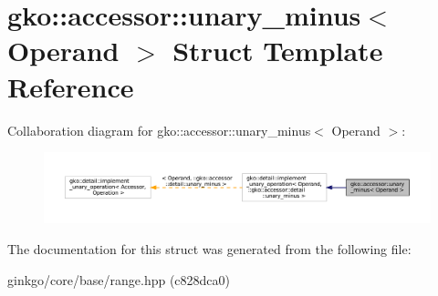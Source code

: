 \hypertarget{structgko_1_1accessor_1_1unary__minus}{}\section{gko\+:\+:accessor\+:\+:unary\+\_\+minus$<$ Operand $>$ Struct Template Reference}
\label{structgko_1_1accessor_1_1unary__minus}


Collaboration diagram for gko\+:\+:accessor\+:\+:unary\+\_\+minus$<$ Operand $>$\+:
\nopagebreak
\begin{figure}[H]
\begin{center}
\leavevmode
\includegraphics[width=350pt]{structgko_1_1accessor_1_1unary__minus__coll__graph}
\end{center}
\end{figure}


The documentation for this struct was generated from the following file\+:\begin{DoxyCompactItemize}
\item 
ginkgo/core/base/range.\+hpp (c828dca0)\end{DoxyCompactItemize}
